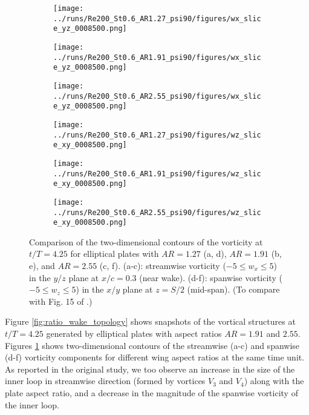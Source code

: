 \begin{figure}
  \centering
  \begin{subfigure}[c]{0.3\textwidth}
    \centering
    \texttt{[image: ../runs/Re200\_St0.6\_AR1.27\_psi90/figures/wx\_slice\_yz\_0008500.png]}
    \caption{}
  \end{subfigure}
  \begin{subfigure}[c]{0.3\textwidth}
    \centering
    \texttt{[image: ../runs/Re200\_St0.6\_AR1.91\_psi90/figures/wx\_slice\_yz\_0008500.png]}
    \caption{}
  \end{subfigure}
  \begin{subfigure}[c]{0.34\textwidth}
    \centering
    \texttt{[image: ../runs/Re200\_St0.6\_AR2.55\_psi90/figures/wx\_slice\_yz\_0008500.png]}
    \caption{}
  \end{subfigure}
  \vspace{0.5cm}
  \begin{subfigure}[c]{0.32\textwidth}
    \centering
    \texttt{[image: ../runs/Re200\_St0.6\_AR1.27\_psi90/figures/wz\_slice\_xy\_0008500.png]}
    \caption{}
  \end{subfigure}
  \begin{subfigure}[c]{0.32\textwidth}
    \centering
    \texttt{[image: ../runs/Re200\_St0.6\_AR1.91\_psi90/figures/wz\_slice\_xy\_0008500.png]}
    \caption{}
  \end{subfigure}
  \begin{subfigure}[c]{0.32\textwidth}
    \centering
    \texttt{[image: ../runs/Re200\_St0.6\_AR2.55\_psi90/figures/wz\_slice\_xy\_0008500.png]}
    \caption{}
  \end{subfigure}
  \caption{Comparison of the two-dimensional contours of the vorticity at $t/T = 4.25$ for elliptical plates with $AR = 1.27$ (a, d), $AR = 1.91$ (b, e), and $AR = 2.55$ (c, f). (a-c): streamwise vorticity ($-5 \leq w_x \leq 5$) in the $y/z$ plane at $x/c = 0.3$ (near wake). (d-f): spanwise vorticity ($-5 \leq w_z \leq 5$) in the $x/y$ plane at $z = S/2$ (mid-span). (To compare with Fig. 15 of \citet{li_dong_2016}.)}
  \label{fig:ratio_vorticity_slices}
\end{figure}

Figure \ref{fig:ratio_wake_topology} shows snapshots of the vortical structures at $t/T = 4.25$ generated by elliptical plates with aspect ratios $AR = 1.91$ and $2.55$.
Figures \ref{fig:ratio_vorticity_slices} shows two-dimensional contours of the streamwise (a-c) and spanwise (d-f) vorticity components for different wing aspect ratios at the same time unit.
As reported in the original study, we too observe an increase in the size of the inner loop in streamwise direction (formed by vortices $V_3$ and $V_4$) along with the plate aspect ratio, and a decrease in the magnitude of the spanwise vorticity of the inner loop.

